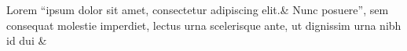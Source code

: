 \documentclass{article}
\begin{document}
\beginnumbering

\stanza
Lorem \enquote{ipsum dolor sit amet, consectetur adipiscing elit.& 
Nunc posuere}, sem consequat molestie imperdiet, lectus urna scelerisque ante, ut dignissim urna nibh id dui \&
\endnumbering
\end{document}
